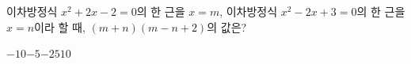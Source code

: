 이차방정식 $x^2+2x-2=0$의 한 근을 $x=m$, 이차방정식 $x^2-2x+3=0$의 한 근을 $x=n$이라 할 때, $(m+n)(m-n+2)$의 값은?
\begin{choices32}{$-10$}{$-5$}{$-2$}{$5$}{$10$}\end{choices32}
